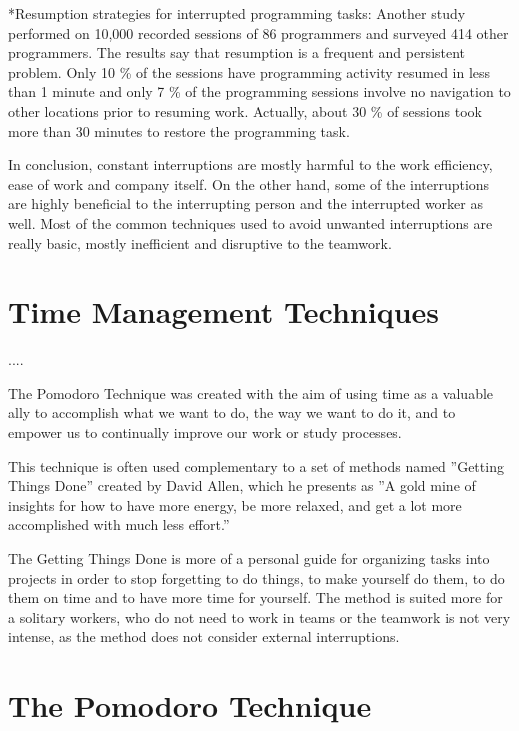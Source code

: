 \documentclass[11pt,singleside]{myfithesis2}
\makeatletter
\renewcommand\paragraph{
   \vspace{-10pt}
   \@startsection{paragraph}{4}{0mm}
      {\baselineskip}
      {- 5pt}
      {\normalfont\normalsize\bfseries}
}
\makeatother
\begin{document}
\paragraph*{Resumption strategies for interrupted programming tasks: } Another study \cite{studyResumptionStrategies} performed on 10,000 recorded sessions of 86 programmers and surveyed 414 other programmers. The results say that resumption is a frequent and persistent problem. Only 10 \% of the sessions have programming activity resumed in less than 1 minute and only 7 \% of the programming sessions involve no navigation to other locations prior to resuming work. Actually, about 30 \% of sessions took more than 30 minutes to restore the programming task.

In conclusion, constant interruptions are mostly harmful to the work efficiency, ease of work and company itself. On the other hand, some of the interruptions are highly beneficial to the interrupting person and the interrupted worker as well. Most of the common techniques used to avoid unwanted interruptions are really basic, mostly inefficient and disruptive to the teamwork.

	\section{Time Management Techniques}

....

The Pomodoro Technique \cite{pomodoro} was created with the aim of using time as a valuable ally to accomplish what we want to do, the way we want to do it, and to empower us to continually improve our work or study processes. 

This technique is often used complementary to a set of methods named ''Getting Things Done'' \cite{gtd} created by David Allen, which he presents as ''A gold mine of insights for how to have more energy, be more relaxed, and get a lot more accomplished with much less effort.''	
	
The Getting Things Done is more of a personal guide for organizing tasks into projects in order to stop forgetting to do things, to make yourself do them, to do them on time and to have more time for yourself. The method is suited more for a solitary workers, who do not need to work in teams or the teamwork is not very intense, as the method does not consider external interruptions.

	\section{The Pomodoro Technique}
\end{document}
